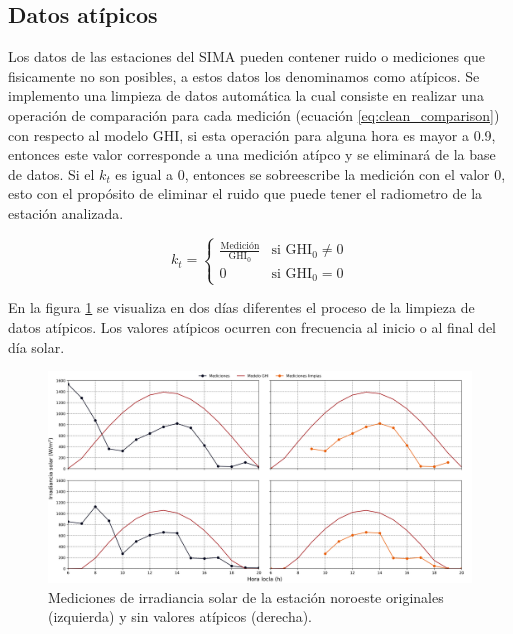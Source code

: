 \subsection{Datos atípicos}

Los datos de las estaciones del SIMA pueden contener ruido o mediciones que fisicamente no son posibles, a estos datos los denominamos como atípicos. Se implemento una limpieza de datos automática la cual consiste en realizar una operación de comparación para cada medición (ecuación \ref{eq:clean_comparison}) con respecto al modelo GHI, si esta operación para alguna hora es mayor a 0.9, entonces este valor corresponde a una medición atípco y se eliminará de la base de datos. Si el $k_t$ es igual a 0, entonces se sobreescribe la medición con el valor 0, esto con el propósito de eliminar el ruido que puede tener el radiometro de la estación analizada.

\begin{equation}
	k_t =\begin{cases}
		\frac{\text{Medición}}{\text{GHI}_0} & \text{si GHI}_0\neq 0 \\
		0                                    & \text{si GHI}_0 = 0
	\end{cases}
	\label{eq:clean_comparison}
\end{equation}

En la figura \ref{fig:example_clean_data} se visualiza en dos días diferentes el proceso de la limpieza de datos atípicos. Los valores atípicos ocurren con frecuencia al inicio o al final del día solar.

\begin{figure}[H]
	\centering
	\includegraphics[width=15cm]{Graphics/example_clean_data.png}
	\caption{Mediciones de irradiancia solar de la estación noroeste originales (izquierda) y sin valores atípicos (derecha).}
	\label{fig:example_clean_data}
\end{figure}

